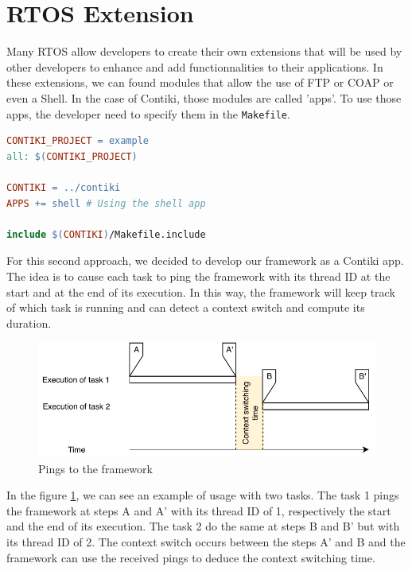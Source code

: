 \section{RTOS Extension}

Many RTOS allow developers to create their own extensions that will be used by other developers to enhance and add functionnalities to their applications.
In these extensions, we can found modules that allow the use of FTP or COAP or even a Shell.
In the case of Contiki, those modules are called 'apps'.
To use those apps, the developer need to specify them in the \texttt{Makefile}.

\begin{lstlisting}[style=CStyle, language=make, caption=Example of Makefile using the app \texttt{shell} with Contiki]
CONTIKI_PROJECT = example
all: $(CONTIKI_PROJECT)

CONTIKI = ../contiki
APPS += shell # Using the shell app

include $(CONTIKI)/Makefile.include
\end{lstlisting}

For this second approach, we decided to develop our framework as a Contiki app.
The idea is to cause each task to ping the framework with its thread ID at the start and at the end of its execution.
In this way, the framework will keep track of which task is running and can detect a context switch and compute its duration.

\begin{figure}[!ht]
  \centering
  \includegraphics[scale=1]{assets/internal-framework-ping.pdf}
  \caption{\label{fig:internal-framework-ping}Pings to the framework}
\end{figure}

In the figure \ref{fig:internal-framework-ping}, we can see an example of usage with two tasks.
The task 1 pings the framework at steps A and A' with its thread ID of 1, respectively the start and the end of its execution.
The task 2 do the same at steps B and B' but with its thread ID of 2.
The context switch occurs between the steps A' and B and the framework can use the received pings to deduce the context switching time.

